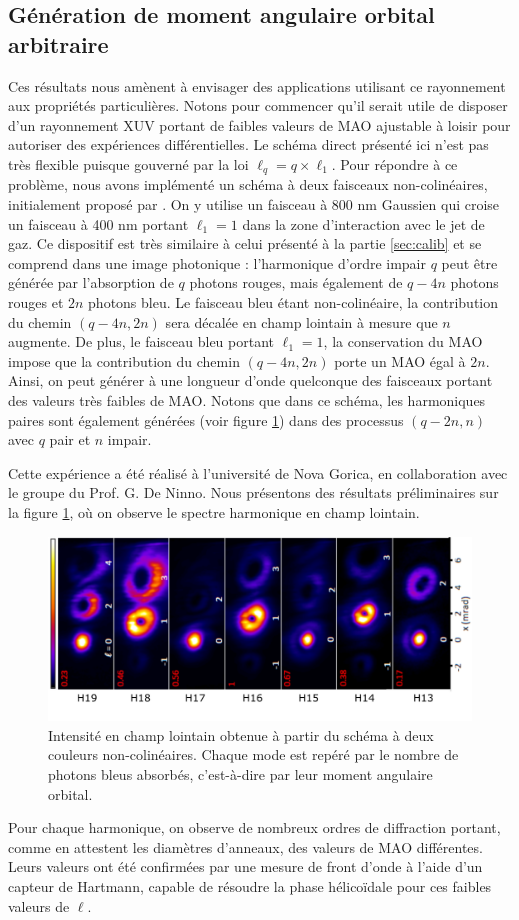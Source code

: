 \subsection{Génération de moment angulaire orbital arbitraire}
Ces résultats nous amènent à envisager des applications utilisant ce rayonnement aux propriétés particulières. Notons pour commencer qu'il serait utile de disposer d'un rayonnement XUV portant de faibles valeurs de MAO ajustable à loisir pour autoriser des expériences différentielles. Le schéma direct présenté ici n'est pas très flexible puisque gouverné par la loi $\ell_q=q\times\ell_1$. Pour répondre à ce problème, nous avons implémenté un schéma à deux faisceaux non-colinéaires, initialement proposé par . On y utilise un faisceau à 800 nm Gaussien qui croise un faisceau à 400 nm portant $\ell_1 = 1$ dans la zone d'interaction avec le jet de gaz. Ce dispositif est très similaire à celui présenté à la partie \ref{sec:calib} et se comprend dans une image photonique : l'harmonique d'ordre impair $q$ peut être générée par l'absorption de $q$ photons rouges, mais également de $q-4n$ photons rouges et $2n$ photons bleu. Le faisceau bleu étant non-colinéaire, la contribution du chemin $(q-4n,2n)$ sera décalée en champ lointain à mesure que $n$ augmente. De plus, le faisceau bleu portant $\ell_1=1$, la conservation du MAO impose que la contribution du chemin $(q-4n,2n)$ porte un MAO égal à $2n$. Ainsi, on peut générer à une longueur d'onde quelconque des faisceaux portant des valeurs très faibles de MAO. Notons que dans ce schéma, les harmoniques paires sont également générées (voir figure \ref{fig:gauthier}) dans des processus $(q-2n,n)$ avec $q$ pair et $n$ impair.

Cette expérience a été réalisé à l'université de Nova Gorica, en collaboration avec le groupe du Prof. G. De Ninno. Nous présentons des résultats préliminaires sur la figure \ref{fig:gauthier}, où on observe le spectre harmonique en champ lointain. 

\begin{figure}[!ht]
\centering
\includegraphics[width=0.8\columnwidth]{Figures/Conclusion/gauthier.pdf}%
\caption{Intensité en champ lointain obtenue à partir du schéma à deux couleurs non-colinéaires. Chaque mode est repéré par le nombre de photons bleus absorbés, c'est-à-dire par leur moment angulaire orbital.}
\label{fig:gauthier}
\end{figure}
Pour chaque harmonique, on observe de nombreux ordres de diffraction portant, comme en attestent les diamètres d'anneaux, des valeurs de MAO différentes. Leurs valeurs ont été confirmées par une mesure de front d'onde à l'aide d'un capteur de Hartmann, capable de résoudre la phase hélicoïdale pour ces faibles valeurs de $\ell$.

